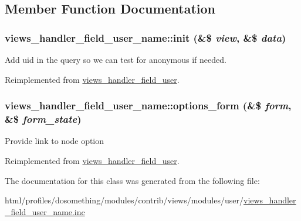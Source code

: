 \subsection{Member Function Documentation}
\hypertarget{classviews__handler__field__user__name_a5879bbaa4a1e59f9509b9a5d6fbdd9b2}{
\subsubsection[{init}]{\setlength{\rightskip}{0pt plus 5cm}views\_\-handler\_\-field\_\-user\_\-name::init (\&\$ {\em view}, \/  \&\$ {\em data})}}
\label{classviews__handler__field__user__name_a5879bbaa4a1e59f9509b9a5d6fbdd9b2}
Add uid in the query so we can test for anonymous if needed. 

Reimplemented from \hyperlink{classviews__handler__field__user_a94156733dfddeb57dbd856e0f574cde6}{views\_\-handler\_\-field\_\-user}.\hypertarget{classviews__handler__field__user__name_a0c3b7db3d060e384287fa62f348c9387}{
\subsubsection[{options\_\-form}]{\setlength{\rightskip}{0pt plus 5cm}views\_\-handler\_\-field\_\-user\_\-name::options\_\-form (\&\$ {\em form}, \/  \&\$ {\em form\_\-state})}}
\label{classviews__handler__field__user__name_a0c3b7db3d060e384287fa62f348c9387}
Provide link to node option 

Reimplemented from \hyperlink{classviews__handler__field__user_aecf77682fa7dc9daf1fa97cbe045420d}{views\_\-handler\_\-field\_\-user}.

The documentation for this class was generated from the following file:\begin{DoxyCompactItemize}
\item 
html/profiles/dosomething/modules/contrib/views/modules/user/\hyperlink{views__handler__field__user__name_8inc}{views\_\-handler\_\-field\_\-user\_\-name.inc}\end{DoxyCompactItemize}
